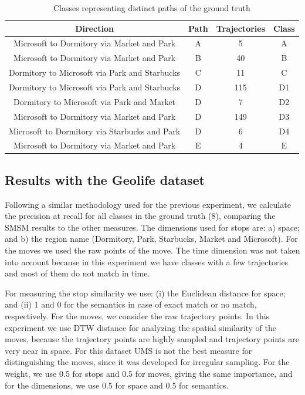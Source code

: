 \begin{table}[ht!]
\scriptsize
  \centering
  \begin{tabular}{|c|c|c|c|}
  \hline
 Direction & Path &  Trajectories & Class \\
  \hline
Microsoft to Dormitory via Market and Park& A & 5 & A \\
Microsoft to Dormitory via Market and Park& B & 40&B \\
Dormitory to Microsoft via Park and Starbucks& C & 11&C \\
Dormitory to Microsoft via Park and Starbucks& D & 115&D1 \\
Dormitory to Microsoft via Park and Market& D & 7&D2 \\
Microsoft to Dormitory via Market and Park& D & 149&D3 \\
Microsoft to Dormitory via Starbucks and Park& D & 6&D4 \\
Microsoft to Dormitory via Market and Park& E & 4& E \\
    \hline
  \end{tabular}
  \caption{Classes representing distinct paths of the ground truth}
  \label{tab:geolife_dataset}
\end{table}

\subsection{Results with the Geolife dataset}

Following a similar methodology used for the previous experiment, we calculate the precision at recall for all classes in the ground truth (8), comparing the SMSM results to the other measures. The dimensions used for stops are: a) space; and b) the region name (Dormitory, Park, Starbucks, Market and Microsoft). For the moves we used the raw points of the move. The time dimension was not taken into account because in this experiment we have classes with a few trajectories and most of them do not match in time.

For measuring the stop similarity we use: (i) the Euclidean distance for space; and (ii) 1 and 0 for the semantics in case of exact match or no match, respectively. For the moves,  we consider the raw trajectory points. In this experiment we use DTW distance for analyzing the spatial similarity of the moves, because the trajectory points are highly sampled {and trajectory points are very near in space}.
For this dataset UMS is not the best measure for distinguishing the moves{, since it was developed for irregular sampling}. For the weight, we use 0.5 for stops and 0.5 for moves, giving the same importance, and for the dimensions, we use 0.5 for space and 0.5 for semantics.

